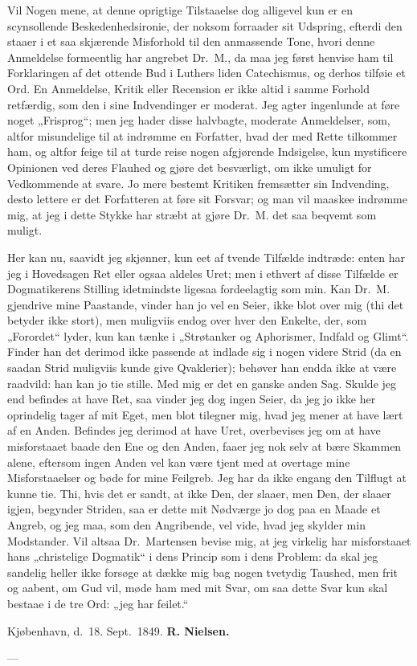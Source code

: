 Vil Nogen mene, at denne oprigtige Tilstaaelse dog alligevel kun
er en scynsollende Beskedenhedsironie, der noksom forraader sit
Udspring, efterdi den staaer i et saa skjærende Misforhold til den
anmassende Tone, hvori denne Anmeldelse formeentlig har angrebet
Dr.\ M., da maa jeg først henvise ham til Forklaringen af det
ottende Bud i Luthers liden Catechismus, og derhos tilføie et Ord.
En Anmeldelse, Kritik eller Recension er ikke altid i samme
Forhold retfærdig, som den i sine Indvendinger er moderat. Jeg
agter ingenlunde at føre noget „Frisprog“; men jeg hader disse
halvbagte, moderate Anmeldelser, som, altfor misundelige til at
indrømme en Forfatter, hvad der med Rette tilkommer ham, og altfor
feige til at turde reise nogen afgjørende Indsigelse, kun
mystificere Opinionen ved deres Flauhed og gjøre det besværligt,
om ikke umuligt for Vedkommende at svare.
 Jo mere bestemt Kritiken fremsætter sin Indvending, desto lettere
er det Forfatteren at føre sit Forsvar; og man vil maaskee
indrømme mig, at jeg i dette Stykke har stræbt at gjøre Dr.\ M.
det saa beqvemt som muligt.

Her kan nu, saavidt jeg skjønner, kun eet af tvende Tilfælde
indtræde: enten har jeg i Hovedsagen Ret eller ogsaa aldeles Uret;
men i ethvert af disse Tilfælde er Dogmatikerens Stilling
idetmindste ligesaa fordeelagtig som min. Kan Dr.\ M. gjendrive
mine Paastande, vinder han jo vel en Seier, ikke blot over mig
(thi det betyder ikke stort), men muligviis endog over hver den
Enkelte, der, som „Forordet“ lyder, kun kan tænke i „Strøtanker og
Aphorismer, Indfald og Glimt“. Finder han det derimod ikke
passende at indlade sig i nogen videre Strid (da en saadan Strid
muligviis kunde give Qvaklerier); behøver han endda ikke at være
raadvild: han kan jo tie stille. Med mig er det en ganske anden
Sag. Skulde jeg end befindes at have Ret, saa vinder jeg dog ingen
Seier, da jeg jo ikke her oprindelig tager af mit Eget, men blot
tilegner mig, hvad jeg mener at have lært af en Anden. Befindes
jeg derimod at have Uret, overbevises jeg om at have misforstaaet
baade den Ene og den Anden, faaer jeg nok selv at bære Skammen
alene, eftersom ingen Anden vel kan være tjent med at overtage
mine Misforstaaelser og bøde for mine Feilgreb. Jeg har da ikke
engang den Tilflugt at kunne tie. Thi, hvis det er sandt, at ikke
Den, der slaaer, men Den, der slaaer igjen, begynder Striden, saa
er
 dette mit Nødværge jo dog paa en Maade et Angreb, og jeg maa, som
den Angribende, vel vide, hvad jeg skylder min Modstander. Vil
altsaa Dr.\ Martensen bevise mig, at jeg virkelig har misforstaaet
hans „christelige Dogmatik“ i dens Princip som i dens Problem: da
skal jeg sandelig heller ikke forsøge at dække mig bag nogen
tvetydig Taushed, men frit og aabent, om Gud vil, møde ham med mit
Svar, om saa dette Svar kun skal bestaae i de tre Ord: „jeg har
feilet.“

\bigskip
\noindent Kjøbenhavn, d.\ 18. Sept.\ 1849.
\hfill {\bfseries R. Nielsen.}\hspace{2em}

\begin{center}---\end{center}


